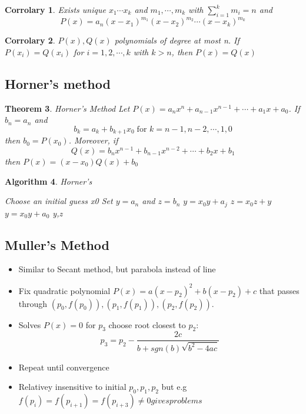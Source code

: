\documentclass[12pt]{article}
\newtheorem{theorem}{Theorem}[subsection]
\newtheorem{cor}[theorem]{Corrolary}
\newtheorem{alg}[theorem]{Algorithm}
\begin{document}
\begin{cor}
	Exists unique $x_1 \cdots x_k$ and $m_1,\cdots, m_k$ with $\sum_{i=1}^k m_i = n$ and $$P(x) = a_n(x-x_1)^{m_1}(x-x_2)^{m_2}\cdots (x-x_k)^{m_k}$$
\end{cor}

\begin{cor}
$P(x), Q(x)$ polynomials of  degree at most n. If $P(x_i) = Q(x_i)$ for $i = 1,2,\cdots, k$ with $k>n$, then $P(x) = Q(x)$	
\end{cor}


\subsection{Horner's method}
\begin{theorem} {Horner's Method}
\newline Let $P(x) = a_nx^n +a_{n-1}x^{n-1} + \cdots +a_1x + a_0$. If $b_n = a_n$ and $$b_k = a_k +b_{k+1}x_0 \; \text{for $k = n-1, n-2, \cdots, 1,0$}$$
then $b_0 = P(x_0)$. Moreover, if 
$$ Q(x) = b_nx^{n-1} + b_{n-1}x^{n-2} + \cdots + b_2x + b_1$$
then $P(x) = (x - x_0)Q(x) + b_0$
\end{theorem}

\begin{alg}{Horner's }
	\begin{algorithmic}
	Choose an initial guess x0
	\State Set $y = a_n$ and $z = b_n$
	\State $y = x_0y + a_j$
	\State $z = x_0z + y$
	\EndFor	
	\State $y = x_0y + a_0$
	\State \Return y,z
	\end{algorithmic}
	
\end{alg}


\subsection{Muller's Method}
\begin{itemize}
	\item Similar to Secant method, but parabola instead of line
	\item Fix quadratic polynomial $P(x) = a(x-p_2)^2 +b(x - p_2) + c$ that passes through $(p_0,f(p_0)),(p_1,f(p_1)),(p_2,f(p_2))$.
	\item Solves $P(x) = 0$ for $p_3$ choose root closest to $p_2$:
	$$p_3 = p_2 - \frac{2c}{b + sgn(b)\sqrt{b^2 - 4ac}}$$
	\item Repeat until convergence
	\item Relativey insensitive to initial $p_0,p_1,p_2$ but e.g $f(p_i) = f(p_{i+1}) = f(p_{i+3}) \neq 0 gives problems$
\end{itemize}

\end{document}
